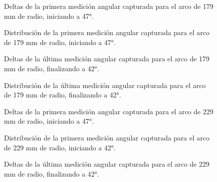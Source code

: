 \begin{figure}[H]
	\centering
	\caption{Deltas de la primera medición angular capturada para el arco de 179 mm de radio, iniciando a 47°.}
	\label{fig:lecturas_theta47_2}
\end{figure}

\begin{figure}[H]
	\centering
	\caption{Distribución de la primera medición angular capturada para el arco de 179 mm de radio, iniciando a 47°.}
	\label{fig:histograma_theta47_2}
\end{figure}

\begin{figure}[H]
	\centering
	\caption{Deltas de la última medición angular capturada para el arco de 179 mm de radio, finalizando a 42°.}
	\label{fig:lecturas_theta42_2}
\end{figure}

\begin{figure}[H]
	\centering
	\caption{Distribución de la última medición angular capturada para el arco de 179 mm de radio, finalizando a 42°.}
	\label{fig:histograma_theta42_2}
\end{figure}

\begin{figure}[H]
	\centering
	\caption{Deltas de la primera medición angular capturada para el arco de 229 mm de radio, iniciando a 47°.}
	\label{fig:lecturas_theta47_3}
\end{figure}

\begin{figure}[H]
	\centering
	\caption{Distribución de la primera medición angular capturada para el arco de 229 mm de radio, iniciando a 42°.}
	\label{fig:histograma_theta47_3}
\end{figure}

\begin{figure}[H]
	\centering
	\caption{Deltas de la última medición angular capturada para el arco de 229 mm de radio, finalizando a 42°.}
	\label{fig:lecturas_theta42_3}
\end{figure}

